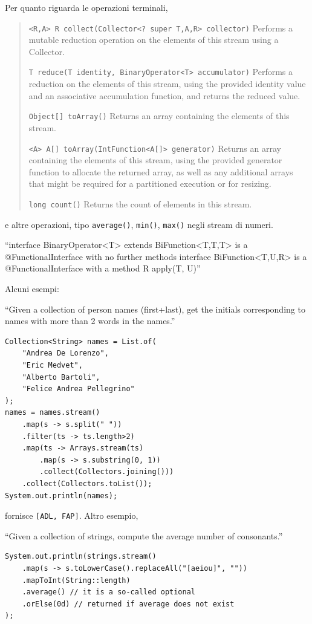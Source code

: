 \documentclass[\fontsizeclass,twocolumn]{\classname}
\theoremstyle{definition}
\theoremstyle{definition}
\begin{document}
Per quanto riguarda le operazioni terminali,
\begin{quote}
    \footnotesize{\texttt{<R,A> R 	collect(Collector<? super T,A,R> collector)} 	Performs a mutable reduction operation on the elements of this stream using a Collector.

\texttt{T 	reduce(T identity, BinaryOperator<T> accumulator)} 	Performs a reduction on the elements of this stream, using the provided identity value and an associative accumulation function, and returns the reduced value.

\texttt{Object[] 	toArray()} 	Returns an array containing the elements of this stream.

\texttt{<A> A[] 	toArray(IntFunction<A[]> generator)} 	Returns an array containing the elements of this stream, using the provided generator function to allocate the returned array, as well as any additional arrays that might be required for a partitioned execution or for resizing.

\texttt{long 	count()} 	Returns the count of elements in this stream.}
\end{quote}

e altre operazioni, tipo \texttt{average()}, \texttt{min()}, \texttt{max()}
negli stream di numeri.

``interface BinaryOperator<T> extends BiFunction<T,T,T> is a @FunctionalInterface with no further methods
    interface BiFunction<T,U,R> is a @FunctionalInterface with a method R apply(T, U)''

Alcuni esempi:

``Given a collection of person names (first+last), get the initials
corresponding to names with more than 2 words in the names.''

\begin{lstlisting}
Collection<String> names = List.of(
    "Andrea De Lorenzo",
    "Eric Medvet",
    "Alberto Bartoli",
    "Felice Andrea Pellegrino"
);
names = names.stream()
    .map(s -> s.split(" "))
    .filter(ts -> ts.length>2)
    .map(ts -> Arrays.stream(ts)
        .map(s -> s.substring(0, 1))
        .collect(Collectors.joining()))
    .collect(Collectors.toList());
System.out.println(names);
\end{lstlisting}

fornisce \texttt{[ADL, FAP]}. Altro esempio,

``Given a collection of strings, compute the average number of consonants.''

\begin{lstlisting}
System.out.println(strings.stream()
    .map(s -> s.toLowerCase().replaceAll("[aeiou]", ""))
    .mapToInt(String::length)
    .average() // it is a so-called optional
    .orElse(0d) // returned if average does not exist
);
\end{lstlisting}
\end{document}
